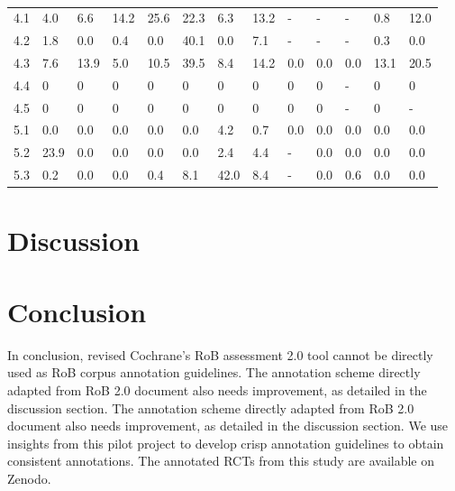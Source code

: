 \documentclass{IOS-Book-Article}
\begin{document}
\begin{table}[!ht]
\begin{tabular}{|l||l|l|l|l|l|l|l||l|l|l|l|l|}
        4.1 & 4.0 & 6.6 & 14.2 & 25.6 & 22.3 & 6.3 & 13.2 & - & - & - & 0.8 & 12.0 \\ 
        4.2 & 1.8 & 0.0 & 0.4 & 0.0 & 40.1 & 0.0 & 7.1 & - & - & - & 0.3 & 0.0 \\
        4.3 & 7.6 & 13.9 & 5.0 & 10.5 & 39.5 & 8.4 & 14.2 & 0.0 & 0.0 & 0.0 & 13.1 & 20.5 \\ 
        4.4 & 0 & 0 & 0 & 0 & 0 & 0 & 0 & 0 & 0 & - & 0 & 0 \\ 
        4.5 & 0 & 0 & 0 & 0 & 0 & 0 & 0 & 0 & 0 & - & 0 & - \\ \hline
        5.1 & 0.0 & 0.0 & 0.0 & 0.0 & 0.0 & 4.2 & 0.7 & 0.0 & 0.0 & 0.0 & 0.0 & 0.0 \\ 
        5.2 & 23.9 & 0.0 & 0.0 & 0.0 & 0.0 & 2.4 & 4.4 & - & 0.0 & 0.0 & 0.0 & 0.0 \\ 
        5.3 & 0.2 & 0.0 & 0.0 & 0.4 & 8.1 & 42.0 & 8.4 & - & 0.0 & 0.6 & 0.0 & 0.0 \\ \hline
    \end{tabular}
    \caption{\label{tab:iaa_sq_res}}
\end{table}

%
%
%
\section{Discussion}

\section{Conclusion}
\label{sec:conclusion}
%
In conclusion, revised Cochrane's RoB assessment 2.0 tool cannot be directly used as RoB corpus annotation guidelines.
The annotation scheme directly adapted from RoB 2.0 document also needs improvement, as detailed in the discussion section.
The annotation scheme directly adapted from RoB 2.0 document also needs improvement, as detailed in the discussion section.
We use insights from this pilot project to develop crisp annotation guidelines to obtain consistent annotations.
The annotated RCTs from this study are available on Zenodo.
%
%
%
 
%
%

%
\end{document}
